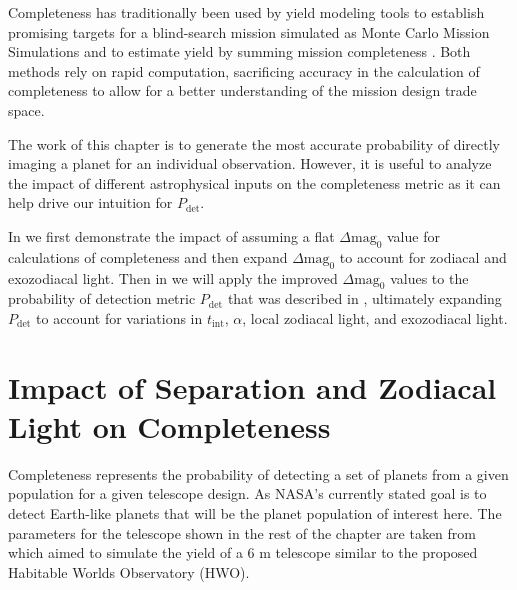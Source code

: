 Completeness has traditionally been used by yield modeling tools to establish
promising targets for a blind-search mission simulated as Monte Carlo
Mission Simulations \citep{savranskyEXOSIMSExoplanetOpenSource2017}
and to estimate yield by summing mission completeness
\citep{Brown2005d}. Both
methods rely on rapid computation, sacrificing accuracy in the calculation of
completeness to allow for a better understanding of the mission design trade
space.

The work of this chapter is to generate the most accurate probability of
directly imaging a planet for an individual observation. However, it is useful
to analyze the impact of different astrophysical inputs on the completeness
metric as it can help drive our intuition for $P_\textrm{det}$.

In  we first demonstrate the impact of
assuming a flat $\Delta\textrm{mag}_0$ value for calculations of completeness
and then expand $\Delta\textrm{mag}_0$ to account for zodiacal and exozodiacal light. Then in
 we will apply the improved $\Delta\textrm{mag}_0$ values to the probability of
detection metric $P_\textrm{det}$ that was described in ,
ultimately expanding $P_\textrm{det}$ to account for variations in $t_\textrm{int}$, $\alpha$,
local zodiacal light, and exozodiacal light.


\section{Impact of Separation and Zodiacal Light on Completeness}
\label{sec:impact_on_completeness}

Completeness represents the probability of detecting a set of planets from a
given population for a given telescope design. As NASA's currently stated goal
is to detect Earth-like planets \citep{nasaNASAStrategic2022} that will be the planet population of interest
here. The parameters for the telescope shown in the rest of the chapter are
taken from \citet{morganExplorationExpectedNumber2022a} which aimed to simulate
the yield of a 6 m telescope similar to the proposed Habitable Worlds
Observatory (HWO).

